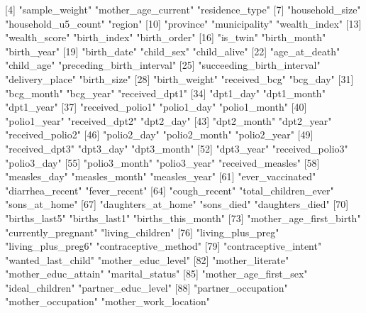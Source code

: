   [4] "sample_weight"             "mother_age_current"        "residence_type"           
  [7] "household_size"            "household_u5_count"        "region"                   
 [10] "province"                  "municipality"              "wealth_index"             
 [13] "wealth_score"              "birth_index"               "birth_order"              
 [16] "is_twin"                   "birth_month"               "birth_year"               
 [19] "birth_date"                "child_sex"                 "child_alive"              
 [22] "age_at_death"              "child_age"                 "preceding_birth_interval" 
 [25] "succeeding_birth_interval" "delivery_place"            "birth_size"               
 [28] "birth_weight"              "received_bcg"              "bcg_day"                  
 [31] "bcg_month"                 "bcg_year"                  "received_dpt1"            
 [34] "dpt1_day"                  "dpt1_month"                "dpt1_year"                
 [37] "received_polio1"           "polio1_day"                "polio1_month"             
 [40] "polio1_year"               "received_dpt2"             "dpt2_day"                 
 [43] "dpt2_month"                "dpt2_year"                 "received_polio2"          
 [46] "polio2_day"                "polio2_month"              "polio2_year"              
 [49] "received_dpt3"             "dpt3_day"                  "dpt3_month"               
 [52] "dpt3_year"                 "received_polio3"           "polio3_day"               
 [55] "polio3_month"              "polio3_year"               "received_measles"         
 [58] "measles_day"               "measles_month"             "measles_year"             
 [61] "ever_vaccinated"           "diarrhea_recent"           "fever_recent"             
 [64] "cough_recent"              "total_children_ever"       "sons_at_home"             
 [67] "daughters_at_home"         "sons_died"                 "daughters_died"           
 [70] "births_last5"              "births_last1"              "births_this_month"        
 [73] "mother_age_first_birth"    "currently_pregnant"        "living_children"          
 [76] "living_plus_preg"          "living_plus_preg6"         "contraceptive_method"     
 [79] "contraceptive_intent"      "wanted_last_child"         "mother_educ_level"        
 [82] "mother_literate"           "mother_educ_attain"        "marital_status"           
 [85] "mother_age_first_sex"      "ideal_children"            "partner_educ_level"       
 [88] "partner_occupation"        "mother_occupation"         "mother_work_location"     
